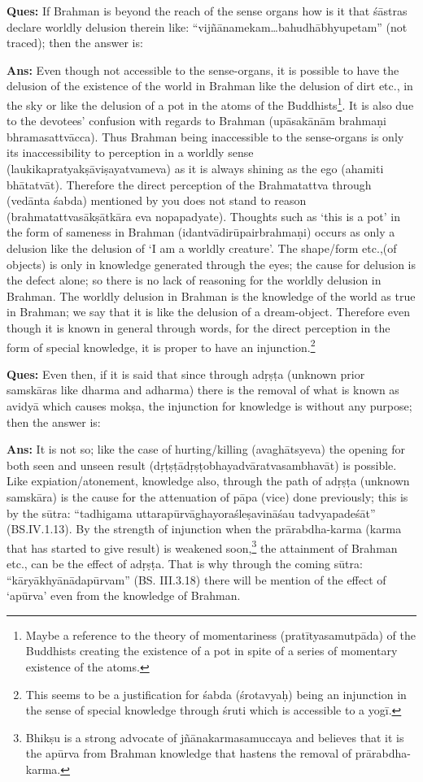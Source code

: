 \textbf{Ques:} If Brahman is beyond the reach of the sense organs how is it that śāstras declare worldly delusion therein like: “vijñānamekam…bahu\-dhābhyupetam” (not traced); then the answer is:

\textbf{Ans:} Even though not accessible to the sense-organs, it is possible to have the delusion of the existence of the world in Brahman like the delusion of dirt etc., in the sky or like the delusion of a pot in the atoms of the Buddhists\footnote{Maybe a reference to the theory of momentariness (pratītyasamutpāda) of the Buddhists creating the existence of a pot in spite of a series of momentary existence of the atoms.}. It is also due to the devotees’ confusion with regards to Brahman (upāsakānām brahmaṇi bhramasattvācca). Thus Brahman being inaccessible to the sense-organs is only its inaccessibility to perception in a worldly sense (laukikapratyakṣāviṣayatvameva) as it is always shining as the ego (ahamiti bhātatvāt). Therefore the direct perception of the Brahmatattva through (vedānta śabda) mentioned by you does not stand to reason (brahmatattvasākṣātkāra eva nopapadyate). Thoughts such as ‘this is a pot’ in the form of sameness in Brahman (idantvādirūpairbrahmaṇi) occurs as only a delusion like the delusion of ‘I am a worldly creature’. The shape/form etc.,(of objects) is only in knowledge generated through the eyes; the cause for delusion is the defect alone; so there is no lack of reasoning for the worldly delusion in Brahman. The worldly delusion in Brahman is the knowledge of the world as true in Brahman; we say that it is like the delusion of a dream-object. Therefore even though it is known in general through words, for the direct perception in the form of special knowledge, it is proper to have an injunction.\footnote{This seems to be a justification for śabda (śrotavyaḥ) being an injunction in the sense of special knowledge through śruti which is accessible to a yogī.}

\textbf{Ques:} Even then, if it is said that since through adṛṣṭa (unknown prior samskāras like dharma and adharma) there is the removal of what is known as avidyā which causes mokṣa, the injunction for knowledge is without any purpose; then the answer is:

\textbf{Ans:} It is not so; like the case of hurting/killing (avaghātsyeva) the opening for both seen and unseen result (dṛṭṣṭādṛṣṭobhayadvāratva\-sambhavāt) is  possible. Like expiation/atonement, knowledge also, through the path of adṛṣṭa (unknown samskāra) is the cause for the attenuation of pāpa (vice) done previously; this is by the sūtra: “tadhigama uttarapūrvāghayoraśleṣavināśau tadvyapadeśāt” (BS.IV.1.13). By the strength of injunction when the prārabdha-karma (karma that has started to give result) is weakened soon,\footnote{Bhikṣu is a strong advocate of jñānakarmasamuccaya and believes that it is the apūrva from Brahman knowledge that hastens the removal of prārabdha-karma.} the attainment of Brahman etc., can be the effect of adṛṣṭa. That is why through the coming sūtra: “kāryākhyānādapūrvam” (BS. III.3.18) there will be mention of the effect of ‘apūrva’ even from the knowledge of Brahman.


